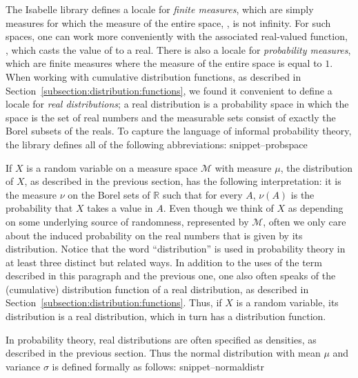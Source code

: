 \documentclass{svjour3}
\newcommand{\RR}{\mathbb{R}}
\newcommand{\mdl}[1]{{\mathcal #1}} %
\newcommand{\Snippet}[1]{\csname snippet--#1\endcsname}
\begin{document}
The Isabelle library defines a locale for \emph{finite measures}, which are simply measures for which the measure of the entire space, , is not infinity. For such spaces, one can work more conveniently with the associated real-valued function, , which casts the value of  to a real. There is also a locale for \emph{probability measures}, which are finite measures where the measure of the entire space is equal to $1$. When working with cumulative distribution functions, as described in Section~\ref{subsection:distribution:functions}, we found it convenient to define a locale for \emph{real distributions}; a real distribution is a probability space in which the space is the set of real numbers and the measurable sets consist of exactly the Borel subsets of the reals. To capture the language of informal probability theory, the library defines all of the following abbreviations:
\Snippet{probspace}

If $X$ is a random variable on a measure space $\mdl M$ with measure $\mu$, the distribution of $X$, as described in the previous section, has the following interpretation: it is the measure $\nu$ on the Borel sets of $\RR$ such that for every $A$, $\nu(A)$ is the probability that $X$ takes a value in $A$. Even though we think of $X$ as depending on some underlying source of randomness, represented by $\mdl M$, often we only care about the induced probability on the real numbers that is given by its distribution. Notice that the word ``distribution'' is used in probability theory in at least three distinct but related ways. In addition to the uses of the term described in this paragraph and the previous one, one also often speaks of the (cumulative) distribution function of a real distribution, as described in Section~\ref{subsection:distribution:functions}. Thus, if $X$ is a random variable, its distribution is a real distribution, which in turn has a distribution function.

In probability theory, real distributions are often specified as densities, as described in the previous section. Thus the normal distribution with mean $\mu$ and variance $\sigma$ is defined formally as follows:
\Snippet{normaldistr}
\end{document}

